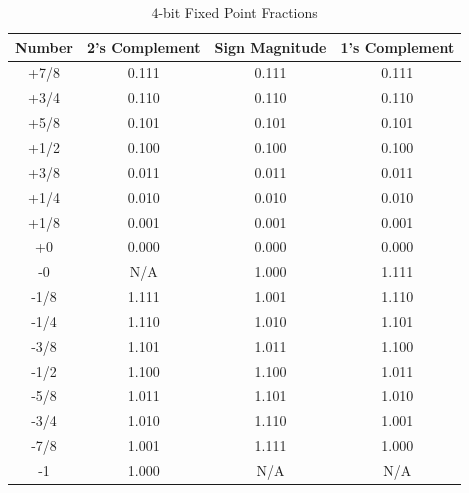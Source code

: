 \documentclass[times, twocolumn, 10pt]{article}
\begin{document}
\begin{table} [t!]
  \centering
  \begin{tabular}{|c|c|c|c|} \hline
    Number  & 2's Complement & Sign Magnitude & 1's Complement \\ \hline \hline
    +7/8   &      0.111     &    0.111       &      0.111      \\ \hline
    +3/4   &      0.110     &    0.110       &      0.110      \\ \hline
    +5/8   &      0.101     &    0.101       &      0.101      \\ \hline
    +1/2   &      0.100     &    0.100       &      0.100      \\ \hline
    +3/8   &      0.011     &    0.011       &      0.011      \\ \hline
    +1/4   &      0.010     &    0.010       &      0.010      \\ \hline
    +1/8   &      0.001     &    0.001       &      0.001      \\ \hline
    +0     &      0.000     &    0.000       &      0.000      \\ \hline
    -0     &       N/A      &    1.000       &      1.111      \\ \hline
    -1/8   &      1.111     &    1.001       &      1.110      \\ \hline
    -1/4   &      1.110     &    1.010       &      1.101      \\ \hline
    -3/8   &      1.101     &    1.011       &      1.100      \\ \hline
    -1/2   &      1.100     &    1.100       &      1.011      \\ \hline
    -5/8   &      1.011     &    1.101       &      1.010      \\ \hline
    -3/4   &      1.010     &    1.110       &      1.001      \\ \hline
    -7/8   &      1.001     &    1.111       &      1.000      \\ \hline
    -1     &      1.000     &     N/A        &       N/A       \\ \hline
  \end{tabular}
  \caption{$4$-bit Fixed Point Fractions}
\end{table}
\end{document}

